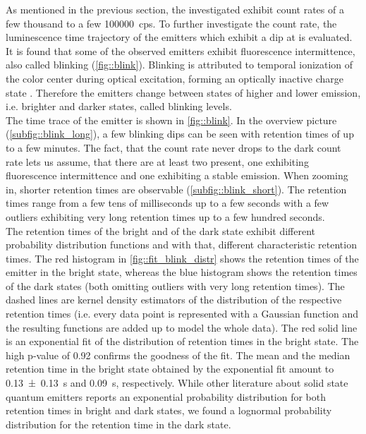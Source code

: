 	As mentioned in the previous section, the investigated \sivs exhibit count rates of a few thousand to a few \SI{100000}{cps}.
	To further investigate the count rate, the luminescence time trajectory of the emitters which exhibit a dip at \gtz is evaluated.
	It is found that some of the observed emitters exhibit fluorescence intermittence, also called blinking (\autoref{fig::blink}).
	Blinking is attributed to temporal ionization of the color center during optical excitation, forming an optically inactive charge state \cite{Jantzen2016,Neu2012a,Gali2013}. 
	Therefore the emitters change between states of higher and lower emission, i.e. brighter and darker states, called blinking levels.
	\\
	The time trace of the emitter is shown in \autoref{fig::blink}.
	In the overview picture (\autoref{subfig::blink_long}), a few blinking dips can be seen with retention times of up to a few minutes.
	The fact, that the count rate never drops to the dark count rate lets us assume, that there are at least two \sivs present, one exhibiting fluorescence intermittence and one exhibiting a stable emission.
	When zooming in, shorter retention times are observable (\autoref{subfig::blink_short}). 
	The retention times range from a few tens of milliseconds up to a few seconds with a few outliers exhibiting very long retention times up to a few hundred seconds.
	\\
	The retention times of the bright and of the dark state exhibit different probability distribution functions and with that, different characteristic retention times.
	The red histogram in \autoref{fig::fit_blink_distr} shows the retention times of the emitter in the bright state, whereas the blue histogram shows the retention times of the dark states (both omitting outliers with very long retention times).
	The dashed lines are kernel density estimators of the distribution of the respective retention times (i.e. every data point is represented with a Gaussian function and the resulting functions are added up to model the whole data).
	The red solid line is an exponential fit of the distribution of retention times in the bright state. 
	The high p-value of \num{0.92} confirms the goodness of the fit.
	The mean and the median retention time in the bright state obtained by the exponential fit amount to \SI[separate-uncertainty]{0.13\pm0.13}{s} and \SI{0.09}{s}, respectively.
	While other literature about solid state quantum emitters reports an exponential probability distribution for both retention times in bright and dark states\cite{Bradac2010,Berhane2017}, we found a lognormal probability distribution for the retention time in the dark state.
